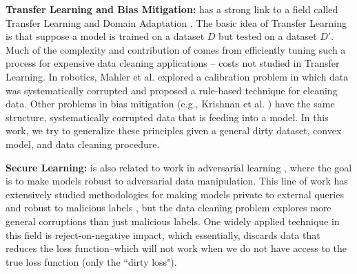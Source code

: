 \noindent \textbf{Transfer Learning and Bias Mitigation: }  
\sys has a strong link to a field called Transfer Learning and Domain Adaptation \cite{pan2010survey}. The basic idea of Transfer Learning is that suppose a model is trained on a dataset $D$ but tested on a dataset $D'$. 
Much of the complexity and contribution of \sys comes from efficiently tuning such a process for expensive data cleaning applications -- costs not studied in Transfer Learning.
In robotics, Mahler et al. explored a calibration problem in which data was systematically corrupted \cite{DBLP:conf/case/MahlerKLSMKPWFAG14} and proposed a rule-based technique for cleaning data.
Other problems in bias mitigation (e.g., Krishnan et al. \cite{DBLP:conf/recsys/KrishnanPFG14}) have the same structure, systematically corrupted data that is feeding into a model.
In this work, we try to generalize these principles given a general dirty dataset, convex model, and data cleaning procedure.


\vspace{0.5em}

\noindent \textbf{Secure Learning: } \sys is also related to work in adversarial learning \cite{nelson2012query}, where the goal is to make models robust to adversarial data manipulation.
This line of work has extensively studied methodologies for making models private to external queries and robust to malicious labels \cite{xiaofeature}, but the data cleaning problem explores more general corruptions than just malicious labels.
One widely applied technique in this field is reject-on-negative impact, which essentially, discards data that reduces the loss function--which will not work when we do not have access to the true loss function (only the ``dirty loss"). 



